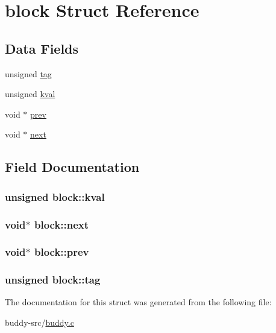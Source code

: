 \hypertarget{structblock}{}\section{block Struct Reference}
\label{structblock}
\subsection*{Data Fields}
\begin{DoxyCompactItemize}
\item 
unsigned \hyperlink{structblock_ac1bec5666e80be0c995f260209ff6980}{tag}
\item 
unsigned \hyperlink{structblock_adf2c77cc2708fa1a48c5914ce0f5f716}{kval}
\item 
void $\ast$ \hyperlink{structblock_afbba5a7bb10773e685e6e4d2b3ad785f}{prev}
\item 
void $\ast$ \hyperlink{structblock_ab079482347194c47edae3bc60e308217}{next}
\end{DoxyCompactItemize}


\subsection{Field Documentation}
\hypertarget{structblock_adf2c77cc2708fa1a48c5914ce0f5f716}{}
\subsubsection[{kval}]{\setlength{\rightskip}{0pt plus 5cm}unsigned block\+::kval}\label{structblock_adf2c77cc2708fa1a48c5914ce0f5f716}
\hypertarget{structblock_ab079482347194c47edae3bc60e308217}{}
\subsubsection[{next}]{\setlength{\rightskip}{0pt plus 5cm}void$\ast$ block\+::next}\label{structblock_ab079482347194c47edae3bc60e308217}
\hypertarget{structblock_afbba5a7bb10773e685e6e4d2b3ad785f}{}
\subsubsection[{prev}]{\setlength{\rightskip}{0pt plus 5cm}void$\ast$ block\+::prev}\label{structblock_afbba5a7bb10773e685e6e4d2b3ad785f}
\hypertarget{structblock_ac1bec5666e80be0c995f260209ff6980}{}
\subsubsection[{tag}]{\setlength{\rightskip}{0pt plus 5cm}unsigned block\+::tag}\label{structblock_ac1bec5666e80be0c995f260209ff6980}


The documentation for this struct was generated from the following file\+:\begin{DoxyCompactItemize}
\item 
buddy-\/src/\hyperlink{buddy_8c}{buddy.\+c}\end{DoxyCompactItemize}
